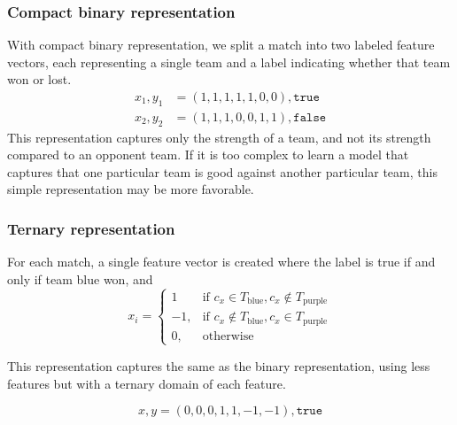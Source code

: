 \subsubsection{Compact binary representation}
With compact binary representation, we split a match into two labeled feature vectors, each representing a single team and a label indicating whether that team won or lost.
\begin{align*}
  x_1, y_1 &= (1,1,1,1,1,0,0), \texttt{true} \\
  x_2, y_2 &= (1,1,1,0,0,1,1), \texttt{false}
\end{align*}
This representation captures only the strength of a team, and not its strength compared to an opponent team.
If it is too complex to learn a model that captures that one particular team is good against another particular team, this simple representation may be more favorable.

\subsubsection{Ternary representation}
For each match, a single feature vector is created where the label is true if and only if team blue won, and
\[
    x_i = 
\begin{cases}
    1 				 & \text{if } c_x \in T_\text{blue}, c_x \not\in T_\text{purple}\\
    -1,              & \text{if } c_x \not\in T_\text{blue}, c_x \in T_\text{purple}\\
    0,              & \text{otherwise}
\end{cases}
\]

This representation captures the same as the binary representation, using less features but with a ternary domain of each feature.

\[x, y = (0,0,0,1,1,-1,-1), \texttt{true}\]



